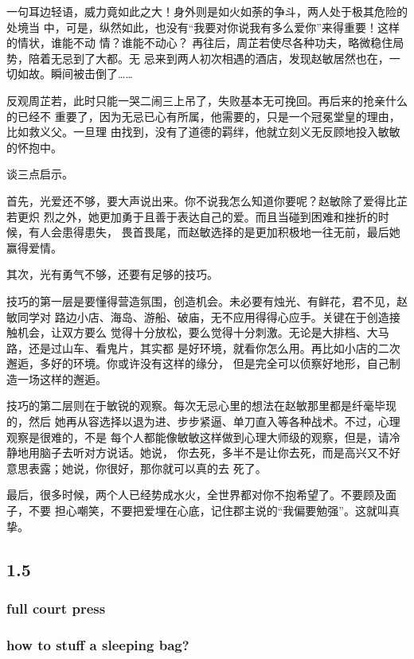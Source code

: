\documentclass[11pt]{article}
\begin{document}
 一句耳边轻语，威力竟如此之大！身外则是如火如荼的争斗，两人处于极其危险的处境当
中，可是，纵然如此，也没有“我要对你说我有多么爱你”来得重要！这样的情状，谁能不动
情？谁能不动心？ 再往后，周芷若使尽各种功夫，略微稳住局势，陪着无忌到了大都。无
忌来到两人初次相遇的酒店，发现赵敏居然也在，一切如故。瞬间被击倒了……

反观周芷若，此时只能一哭二闹三上吊了，失败基本无可挽回。再后来的抢亲什么的已经不
重要了，因为无忌已心有所属，他需要的，只是一个冠冕堂皇的理由，比如救义父。一旦理
由找到，没有了道德的羁绊，他就立刻义无反顾地投入敏敏的怀抱中。

谈三点启示。

 首先，光爱还不够，要大声说出来。你不说我怎么知道你要呢？赵敏除了爱得比芷若更炽
烈之外，她更加勇于且善于表达自己的爱。而且当碰到困难和挫折的时候，有人会患得患失，
畏首畏尾，而赵敏选择的是更加积极地一往无前，最后她赢得爱情。

其次，光有勇气不够，还要有足够的技巧。

技巧的第一层是要懂得营造氛围，创造机会。未必要有烛光、有鲜花，君不见，赵敏同学对
路边小店、海岛、游船、破庙，无不应用得得心应手。关键在于创造接触机会，让双方要么
觉得十分放松，要么觉得十分刺激。无论是大排档、大马路，还是过山车、看鬼片，其实都
是好环境，就看你怎么用。再比如小店的二次邂逅，多好的环境。你或许没有这样的缘分，
但是完全可以侦察好地形，自己制造一场这样的邂逅。

 技巧的第二层则在于敏锐的观察。每次无忌心里的想法在赵敏那里都是纤毫毕现的，然后
她再从容选择以退为进、步步紧逼、单刀直入等各种战术。不过，心理观察是很难的，不是
每个人都能像敏敏这样做到心理大师级的观察，但是，请冷静地用脑子去听对方说话。她说，
你去死，多半不是让你去死，而是高兴又不好意思表露；她说，你很好，那你就可以真的去
死了。

 最后，很多时候，两个人已经势成水火，全世界都对你不抱希望了。不要顾及面子，不要
担心嘲笑，不要把爱埋在心底，记住郡主说的“我偏要勉强”。这就叫真挚。
\subsection*{1.5}
\label{sec:orgheadline10}
\subsubsection*{full court press}
\label{sec:orgheadline7}
\subsubsection*{how to stuff a sleeping bag?}
\label{sec:orgheadline8}
\end{document}
